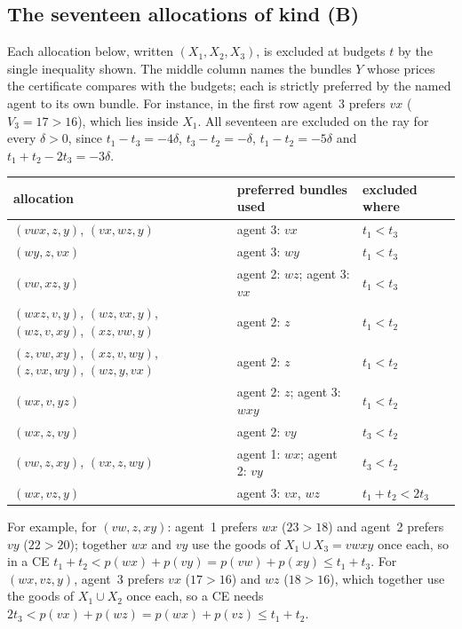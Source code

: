\documentclass[11pt]{article}
\theoremstyle{definition}
\theoremstyle{remark}
\begin{document}
\begin{appendices}

\section{The seventeen allocations of kind (B)}\label{app:typeB}

Each allocation below, written $(X_1,X_2,X_3)$, is excluded at budgets $t$
by the single inequality shown. The middle column names the bundles $Y$
whose prices the certificate compares with the budgets; each is strictly
preferred by the named agent to its own bundle. For instance, in the first
row agent~3 prefers $vx$ ($V_3=17>16$), which lies inside $X_1$. All seventeen are excluded on the
ray for every $\delta>0$, since $t_1-t_3=-4\delta$, $t_3-t_2=-\delta$,
$t_1-t_2=-5\delta$ and $t_1+t_2-2t_3=-3\delta$.

\begin{center}
\begin{tabular}{lll}
\toprule
allocation & preferred bundles used & excluded where\\
\midrule
$(vwx,z,y)$, $(vx,wz,y)$ & agent 3: $vx$ & $t_1<t_3$\\
$(wy,z,vx)$ & agent 3: $wy$ & $t_1<t_3$\\
$(vw,xz,y)$ & agent 2: $wz$; agent 3: $vx$ & $t_1<t_3$\\
$(wxz,v,y)$, $(wz,vx,y)$, $(wz,v,xy)$, $(xz,vw,y)$ & agent 2: $z$ & $t_1<t_2$\\
$(z,vw,xy)$, $(xz,v,wy)$, $(z,vx,wy)$, $(wz,y,vx)$ & agent 2: $z$ & $t_1<t_2$\\
$(wx,v,yz)$ & agent 2: $z$; agent 3: $wxy$ & $t_1<t_2$\\
$(wx,z,vy)$ & agent 2: $vy$ & $t_3<t_2$\\
$(vw,z,xy)$, $(vx,z,wy)$ & agent 1: $wx$; agent 2: $vy$ & $t_3<t_2$\\
$(wx,vz,y)$ & agent 3: $vx$, $wz$ & $t_1+t_2<2t_3$\\
\bottomrule
\end{tabular}
\end{center}

For example, for $(vw,z,xy)$: agent~1 prefers $wx$ ($23>18$) and agent~2
prefers $vy$ ($22>20$); together $wx$ and $vy$ use the goods of
$X_1\cup X_3=vwxy$ once each, so in a CE $t_1+t_2<p(wx)+p(vy)=p(vw)+p(xy)\le
t_1+t_3$. For $(wx,vz,y)$, agent~3 prefers $vx$ ($17>16$) and $wz$
($18>16$), which together use the goods of $X_1\cup X_2$ once each, so a
CE needs $2t_3<p(vx)+p(wz)=p(wx)+p(vz)\le t_1+t_2$.

\end{appendices}
\end{document}

